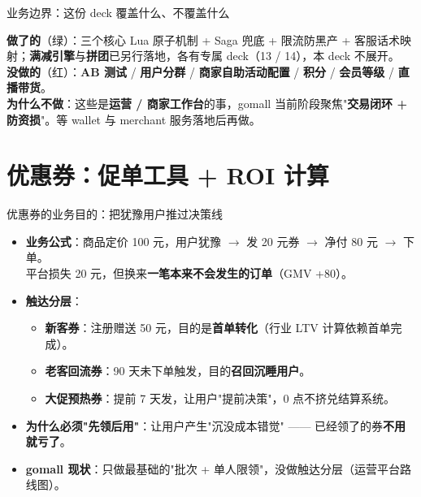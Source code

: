\documentclass[aspectratio=169,11pt]{beamer}
\begin{document}
\begin{frame}[shrink]{业务边界：这份 deck 覆盖什么、不覆盖什么}
\vspace{2mm}
\small \textbf{做了的}（绿）：三个核心 Lua 原子机制 + Saga 兜底 + 限流防黑产 + 客服话术映射；\textbf{满减引擎}与\textbf{拼团}已另行落地，各有专属 deck（13 / 14），本 deck 不展开。\\
\textbf{没做的}（红）：\textbf{AB 测试} / \textbf{用户分群} / \textbf{商家自助活动配置} / \textbf{积分} / \textbf{会员等级} / \textbf{直播带货}。\\
\textbf{为什么不做}：这些是\textbf{运营 / 商家工作台}的事，gomall 当前阶段聚焦"\textbf{交易闭环 + 防资损}"。等 wallet 与 merchant 服务落地后再做。
\end{frame}

\section{优惠券：促单工具 + ROI 计算}

\begin{frame}[shrink]{优惠券的业务目的：把犹豫用户推过决策线}
\begin{itemize}
  \item \textbf{业务公式}：商品定价 100 元，用户犹豫 $\to$ 发 20 元券 $\to$ 净付 80 元 $\to$ 下单。\\
        平台损失 20 元，但换来\textbf{一笔本来不会发生的订单}（GMV +80）。
  \item \textbf{触达分层}：
  \begin{itemize}
    \item \textbf{新客券}：注册赠送 50 元，目的是\textbf{首单转化}（行业 LTV 计算依赖首单完成）。
    \item \textbf{老客回流券}：90 天未下单触发，目的\textbf{召回沉睡用户}。
    \item \textbf{大促预热券}：提前 7 天发，让用户"提前决策"，0 点不挤兑结算系统。
  \end{itemize}
  \item \textbf{为什么必须"先领后用"}：让用户产生"沉没成本错觉" —— 已经领了的券\textbf{不用就亏了}。
  \item \textbf{gomall 现状}：只做最基础的"批次 + 单人限领"，没做触达分层（运营平台路线图）。
\end{itemize}
\end{frame}
\end{document}
